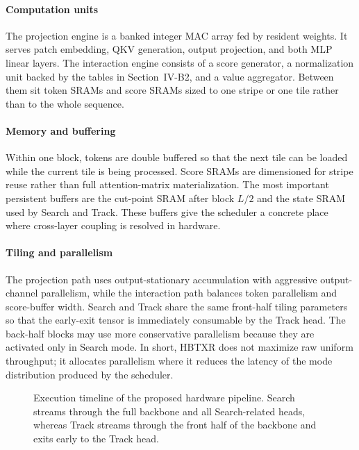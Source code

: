 \documentclass[journal]{IEEEtran}
\newcommand{\placeholderfigure}[2]{%
  \fbox{\parbox[c][#2][c]{#1}{\centering\vspace{2mm}\textbf{Figure placeholder}\\Final artwork pending\vspace{2mm}}}}
\begin{document}
\paragraph*{Computation units}
The projection engine is a banked integer MAC array fed by resident weights. It serves patch embedding, QKV generation, output projection, and both MLP linear layers. The interaction engine consists of a score generator, a normalization unit backed by the tables in Section~IV-B2, and a value aggregator. Between them sit token SRAMs and score SRAMs sized to one stripe or one tile rather than to the whole sequence.

\paragraph*{Memory and buffering}
Within one block, tokens are double buffered so that the next tile can be loaded while the current tile is being processed. Score SRAMs are dimensioned for stripe reuse rather than full attention-matrix materialization. The most important persistent buffers are the cut-point SRAM after block $L/2$ and the state SRAM used by Search and Track. These buffers give the scheduler a concrete place where cross-layer coupling is resolved in hardware.

\paragraph*{Tiling and parallelism}
The projection path uses output-stationary accumulation with aggressive output-channel parallelism, while the interaction path balances token parallelism and score-buffer width. Search and Track share the same front-half tiling parameters so that the early-exit tensor is immediately consumable by the Track head. The back-half blocks may use more conservative parallelism because they are activated only in Search mode. In short, HBTXR does not maximize raw uniform throughput; it allocates parallelism where it reduces the latency of the mode distribution produced by the scheduler.

\begin{figure}[t]
\centering
\placeholderfigure{0.93\textwidth}{1.95in}
\caption{Execution timeline of the proposed hardware pipeline. Search streams through the full backbone and all Search-related heads, whereas Track streams through the front half of the backbone and exits early to the Track head.}
\label{fig:hw_timeline}
\end{figure}
\end{document}
